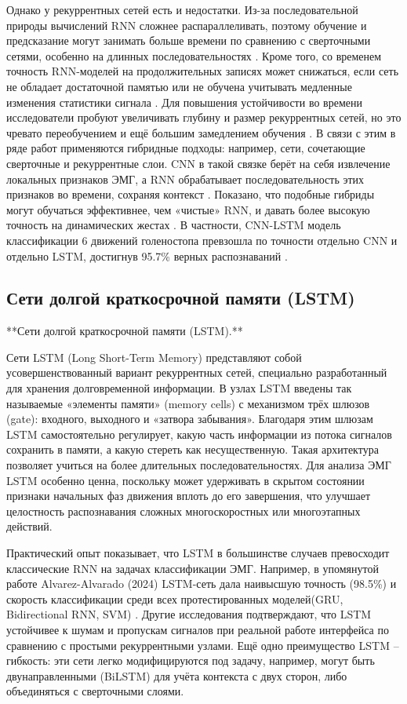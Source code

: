 \documentclass[12pt,a4paper]{article}
\begin{document}
Однако у рекуррентных сетей есть и недостатки. Из-за последовательной природы вычислений RNN сложнее распараллеливать, поэтому обучение и предсказание могут занимать больше времени по сравнению с сверточными сетями, особенно на длинных последовательностях \cite{21}. Кроме того, со временем точность RNN-моделей на продолжительных записях может снижаться, если сеть не обладает достаточной памятью или не обучена учитывать медленные изменения статистики сигнала \cite{22}. Для повышения устойчивости во времени исследователи пробуют увеличивать глубину и размер рекуррентных сетей, но это чревато переобучением и ещё большим замедлением обучения \cite{23}. В связи с этим в ряде работ применяются гибридные подходы: например, сети, сочетающие сверточные и рекуррентные слои. CNN в такой связке берёт на себя извлечение локальных признаков ЭМГ, а RNN обрабатывает последовательность этих признаков во времени, сохраняя контекст \cite{24}. Показано, что подобные гибриды могут обучаться эффективнее, чем «чистые» RNN, и давать более высокую точность на динамических жестах \cite{25}. В частности, CNN-LSTM модель классификации 6 движений голеностопа превзошла по точности отдельно CNN и отдельно LSTM, достигнув 95.7\% верных распознаваний \cite{26}.




\subsection{Сети долгой краткосрочной памяти (LSTM)}
**Сети долгой краткосрочной памяти (LSTM).**


Сети LSTM (Long Short-Term Memory) представляют собой усовершенствованный вариант рекуррентных сетей, специально разработанный для хранения долговременной информации. В узлах LSTM введены так называемые «элементы памяти» (memory cells) с механизмом трёх шлюзов (gate): входного, выходного и «затвора забывания». Благодаря этим шлюзам LSTM самостоятельно регулирует, какую часть информации из потока сигналов сохранить в памяти, а какую стереть как несущественную. Такая архитектура позволяет учиться на более длительных последовательностях. Для анализа ЭМГ LSTM особенно ценна, поскольку может удерживать в скрытом состоянии признаки начальных фаз движения вплоть до его завершения, что улучшает целостность распознавания сложных многоскоростных или многоэтапных действий.


Практический опыт показывает, что LSTM в большинстве случаев превосходит классические RNN на задачах классификации ЭМГ. Например, в упомянутой работе Alvarez-Alvarado (2024) LSTM-сеть дала наивысшую точность (98.5\%) и скорость классификации среди всех протестированных моделей(GRU, Bidirectional RNN, SVM) \cite{20}.  Другие исследования подтверждают, что LSTM устойчивее к шумам и пропускам сигналов при реальной работе интерфейса по сравнению с простыми рекуррентными узлами. Ещё одно преимущество LSTM – гибкость: эти сети легко модифицируются под задачу, например, могут быть двунаправленными (BiLSTM) для учёта контекста с двух сторон, либо объединяться с сверточными слоями.
\end{document}
